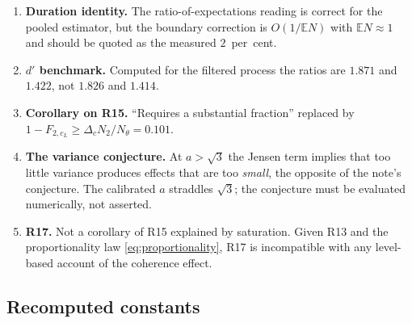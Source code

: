 \documentclass[11pt,a4paper]{article}
\newcommand{\E}{\mathbb{E}}
\theoremstyle{plain}
\theoremstyle{remark}
\begin{document}
\begin{enumerate}
contribute exactly zero crossings because $\theta<g$. Replaced by Prop.~\ref{prop:R69}.
\item \textbf{Duration identity.} The ratio-of-expectations reading is correct for the
pooled estimator, but the boundary correction is $O(1/\E N)$ with $\E N\approx1$ and should
be quoted as the measured $2$~per~cent.
\item \textbf{$d'$ benchmark.} Computed for the filtered process the ratios are $1.871$
and $1.422$, not $1.826$ and $1.414$.
\item \textbf{Corollary on R15.} ``Requires a substantial fraction'' replaced by
$1-F_{2,c_L}\ge\Delta_cN_2/N_\theta=0.101$.
\item \textbf{The variance conjecture.} At $a>\sqrt3$ the Jensen term implies that too
little variance produces effects that are too \emph{small}, the opposite of the note's
conjecture. The calibrated $a$ straddles $\sqrt3$; the conjecture must be evaluated
numerically, not asserted.
\item \textbf{R17.} Not a corollary of R15 explained by saturation. Given R13 and the
proportionality law \eqref{eq:proportionality}, R17 is incompatible with any level-based
account of the coherence effect.
\end{enumerate}

\subsection{Recomputed constants}
\label{sec:numbers}
\end{document}
